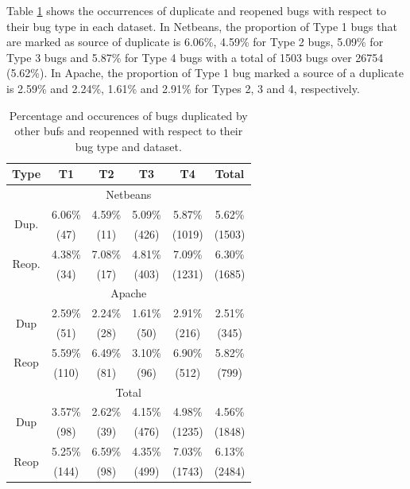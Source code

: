Table \ref{tab:bug-taxo-rq2-dup} shows the occurrences of duplicate and reopened
bugs with respect to their bug type in each dataset. In
Netbeans, the proportion of Type 1 bugs that are marked as
source of duplicate is 6.06\%, 4.59\% for Type 2 bugs, 5.09\%
for Type 3 bugs and 5.87\% for Type 4 bugs with a total of
1503 bugs over 26754 (5.62\%). In Apache, the proportion of
Type 1 bug marked a source of a duplicate is 2.59\% and
2.24\%, 1.61\% and 2.91\% for Types 2, 3 and 4, respectively.

\begin{table}[h!]
\centering
\begin{tabular}{c|c|c|c|c|c}
Type                   & T1     & T2     & T3     & T4     & Total  \\ \hline \hline
\multicolumn{6}{c}{Netbeans}                                      \\ \hline \hline
\multirow{2}{*}{Dup.}  & 6.06\% & 4.59\% & 5.09\% & 5.87\% & 5.62\% \\ 
                       & (47)   & (11)   & (426)  & (1019) & (1503) \\ \hline
\multirow{2}{*}{Reop.} & 4.38\% & 7.08\% & 4.81\% & 7.09\% & 6.30\% \\ 
                       & (34)   & (17)   & (403)  & (1231) & (1685) \\ \hline
\multicolumn{6}{c}{Apache}                                        \\ \hline \hline
\multirow{2}{*}{Dup}   & 2.59\% & 2.24\% & 1.61\% & 2.91\% & 2.51\% \\ \
                       & (51)   & (28)   & (50)   & (216)  & (345)  \\ \hline
\multirow{2}{*}{Reop}  & 5.59\% & 6.49\% & 3.10\% & 6.90\% & 5.82\% \\ 
                       & (110)  & (81)   & (96)   & (512)  & (799)  \\ \hline
\multicolumn{6}{c}{Total}                                         \\ \hline \hline
\multirow{2}{*}{Dup}   & 3.57\% & 2.62\% & 4.15\% & 4.98\% & 4.56\% \\ 
                       & (98)   & (39)   & (476)  & (1235) & (1848) \\ \hline
\multirow{2}{*}{Reop}  & 5.25\% & 6.59\% & 4.35\% & 7.03\% & 6.13\% \\ 
                       & (144)  & (98)   & (499)  & (1743) & (2484) \\ \hline
\end{tabular}
\caption{Percentage and occurences of bugs duplicated by other bufs and reopenned with respect to their bug type and dataset.}
\label{tab:bug-taxo-rq2-dup}
\end{table}

